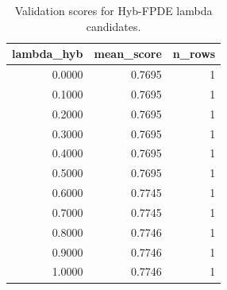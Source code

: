 \begin{table}[t]
\caption{Validation scores for Hyb-FPDE lambda candidates.}
\label{tab:lambda_distribution_computed}
\centering
\begin{tabular}{rrr}
\toprule
lambda\_hyb & mean\_score & n\_rows \\
\midrule
0.0000 & 0.7695 & 1 \\
0.1000 & 0.7695 & 1 \\
0.2000 & 0.7695 & 1 \\
0.3000 & 0.7695 & 1 \\
0.4000 & 0.7695 & 1 \\
0.5000 & 0.7695 & 1 \\
0.6000 & 0.7745 & 1 \\
0.7000 & 0.7745 & 1 \\
0.8000 & 0.7746 & 1 \\
0.9000 & 0.7746 & 1 \\
1.0000 & 0.7746 & 1 \\
\bottomrule
\end{tabular}

\end{table}
